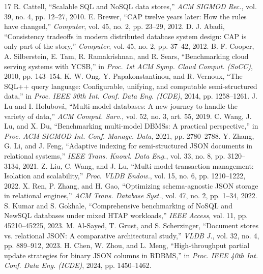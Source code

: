 \documentclass[conference,a4paper]{IEEEtran}
\begin{document}
\balance
\begin{thebibliography}{17}
 R. Cattell, ``Scalable SQL and NoSQL data stores,'' \textit{ACM SIGMOD Rec.}, vol. 39, no. 4, pp. 12--27, 2010.
 E. Brewer, ``CAP twelve years later: How the rules have changed,'' \textit{Computer}, vol. 45, no. 2, pp. 23--29, 2012.
 D. J. Abadi, ``Consistency tradeoffs in modern distributed database system design: CAP is only part of the story,'' \textit{Computer}, vol. 45, no. 2, pp. 37--42, 2012.
 B. F. Cooper, A. Silberstein, E. Tam, R. Ramakrishnan, and R. Sears, ``Benchmarking cloud serving systems with YCSB,'' in \textit{Proc. 1st ACM Symp. Cloud Comput. (SoCC)}, 2010, pp. 143--154.
 K. W. Ong, Y. Papakonstantinou, and R. Vernoux, ``The SQL++ query language: Configurable, unifying, and computable semi-structured data,'' in \textit{Proc. IEEE 30th Int. Conf. Data Eng. (ICDE)}, 2014, pp. 1258--1261. %
 J. Lu and I. Holubov\'a, ``Multi-model databases: A new journey to handle the variety of data,'' \textit{ACM Comput. Surv.}, vol. 52, no. 3, art. 55, 2019.
 C. Wang, J. Lu, and X. Du, ``Benchmarking multi-model DBMSs: A practical perspective,'' in \textit{Proc. ACM SIGMOD Int. Conf. Manage. Data}, 2021, pp. 2780--2788. %
 Y. Zhang, G. Li, and J. Feng, ``Adaptive indexing for semi-structured JSON documents in relational systems,'' \textit{IEEE Trans. Knowl. Data Eng.}, vol. 33, no. 8, pp. 3120--3134, 2021. %
 Z. Liu, C. Wang, and J. Lu, ``Multi-model transaction management: Isolation and scalability,'' \textit{Proc. VLDB Endow.}, vol. 15, no. 6, pp. 1210--1222, 2022. %
 X. Ren, P. Zhang, and H. Gao, ``Optimizing schema-agnostic JSON storage in relational engines,'' \textit{ACM Trans. Database Syst.}, vol. 47, no. 2, pp. 1--34, 2022. %
 S. Kumar and S. Gokhale, ``Comprehensive benchmarking of NoSQL and NewSQL databases under mixed HTAP workloads,'' \textit{IEEE Access}, vol. 11, pp. 45210--45225, 2023. %
 M. Al-Sayed, T. Grust, and S. Scherzinger, ``Document stores vs. relational JSON: A comparative architectural study,'' \textit{VLDB J.}, vol. 32, no. 4, pp. 889--912, 2023. %
 H. Chen, W. Zhou, and L. Meng, ``High-throughput partial update strategies for binary JSON columns in RDBMS,'' in \textit{Proc. IEEE 40th Int. Conf. Data Eng. (ICDE)}, 2024, pp. 1450--1462. %

\end{thebibliography}
\end{document}
